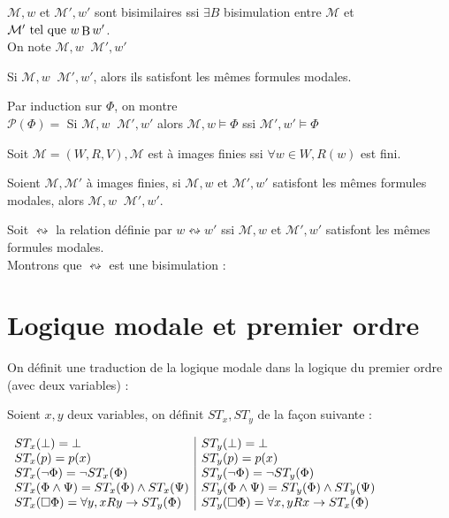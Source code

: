 \documentclass[10pt,a4paper]{article}
\newcommand{\M}{\mathcal{M}}
\DeclareMathOperator{\bisim}{\underline{\leftrightarrow}}
\DeclareMathOperator{\Bo}{B}
\begin{document}
\begin{definition}
 $ \M,w$ et  $ \M',w'$ sont bisimilaires ssi $ \exists B$ bisimulation entre $ \M$ et $ \M' \tq w   \Bo w'$.\\
On note $ \M,w \bisim \M', w'$
\end{definition}

\begin{thm}
 Si $ \M,w \bisim \M', w'$, alors ils satisfont les mêmes formules modales.
\end{thm}

\begin{dem}
 Par induction sur $ \Phi$, on montre\\
$ \mathcal{P}( \Phi)= $ \og Si $ \M,w \bisim \M', w'$ alors $ \M,w \models \Phi$ ssi $ \M',w' \models \Phi$ \fg
\end{dem}

\begin{definition}
 Soit $ \M = (W,R,V), \M$ est à images finies ssi $ \forall w \in W, R(w)$ est fini.
\end{definition}

\begin{prop}
 Soient $ \M, \M'$ à images finies,
si $ \M, w$ et $ \M', w'$ satisfont les mêmes formules modales, alors  $ \M,w \bisim \M', w'$.
\end{prop}
\begin{dem}
 Soit $ \leftrightsquigarrow$ la relation définie par $w \leftrightsquigarrow w'$ ssi $ \M, w$ et $ \M', w'$ satisfont les mêmes formules modales.\\
Montrons que $ \leftrightsquigarrow$ est une bisimulation :

\end{dem}

\section{Logique modale et premier ordre}

On définit une traduction de la logique modale dans la logique du premier ordre (avec deux variables) :

Soient $x,y$ deux variables, on définit $ST_x, ST_y$ de la façon suivante :\\
\begin{center}
 
$ \begin{array}{l | l}
  ST_x( \bot) = \bot & ST_y( \bot) = \bot \\
  ST_x( p) = p(x) & ST_y( p) = p(x) \\
  ST_x( \lnot \Phi) = \lnot ST_x( \Phi) & ST_y( \lnot \Phi) = \lnot ST_y( \Phi) \\
  ST_x( \Phi \wedge \Psi) = ST_x( \Phi) \wedge ST_x(\Psi) & ST_y( \Phi \wedge \Psi) = ST_y( \Phi) \wedge ST_y(\Psi)\\
  ST_x( \Box \Phi) = \forall y, x R y \rightarrow ST_y( \Phi) & ST_y( \Box \Phi) = \forall x, y R x \rightarrow ST_x( \Phi) \\
  \end{array}
$

\end{center}
\end{document}
